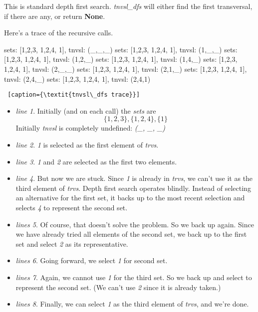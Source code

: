 This is standard depth first search. \textit{tnvsl\_dfs} will either find the first transversal, if there are any, or return \textbf{None}.

Here's a trace of the recursive calls.

\midiumlv
\begin{minipage}[c]{0.45\textwidth}
\begin{python1}  
sets: [{1,2,3}, {1,2,4}, {1}], tnvsl: (_,_,_)
  sets: [{1,2,3}, {1,2,4}, {1}], tnvsl: (1,_,_)
    sets: [{1,2,3}, {1,2,4}, {1}], tnvsl: (1,2,_)
    sets: [{1,2,3}, {1,2,4}, {1}], tnvsl: (1,4,_)
  sets: [{1,2,3}, {1,2,4}, {1}], tnvsl: (2,_,_)
    sets: [{1,2,3}, {1,2,4}, {1}], tnvsl: (2,1,_)
    sets: [{1,2,3}, {1,2,4}, {1}], tnvsl: (2,4,_)
      sets: [{1,2,3}, {1,2,4}, {1}], tnvsl: (2,4,1)
\end{python1}\linv
\begin{lstlisting} [caption={\textit{tnvsl\_dfs trace}}]
\end{lstlisting}
\end{minipage}

\begin{itemize}
    \item \textit{line 1}. Initially (and on each call) the \textit{sets} are \[\{1, 2, 3\}, \{1, 2, 4\}, \{1\}\] Initially \textit{tnvsl} is completely undefined: \textit{(\_, \_, \_)}
    \item  \textit{line 2}. \textit{1} is selected as the first element of \textit{trvs}.
    \item  \textit{line 3}. \textit{1}  and \textit{2} are selected as the first two elements.
    \item \textit{line 4}. But now we are stuck. Since \textit{1} is already in \textit{trvs}, we can't use it as the third element of \textit{trvs}. Depth first search operates blindly. Instead of selecting an alternative for the first set, it backs up to the most recent selection and selects \textit{4} to represent the second set. 
    \item \textit{lines 5}. Of course, that doesn't solve the problem. So we back up again. Since we have already tried all elements of the second set, we back up to the first set and select \textit{2} as its representative. 
    \item \textit{lines 6}. Going forward, we select \textit{1} for second set.
    \item \textit{lines 7}. Again, we cannot use \textit{1} for the third set. So we back up and select  to represent the second set. (We can't use \textit{2} since it is already taken.)
    \item \textit{lines 8}. Finally, we can select \textit{1} as the third element of \textit{trvs}, and we're done.
\end{itemize}

